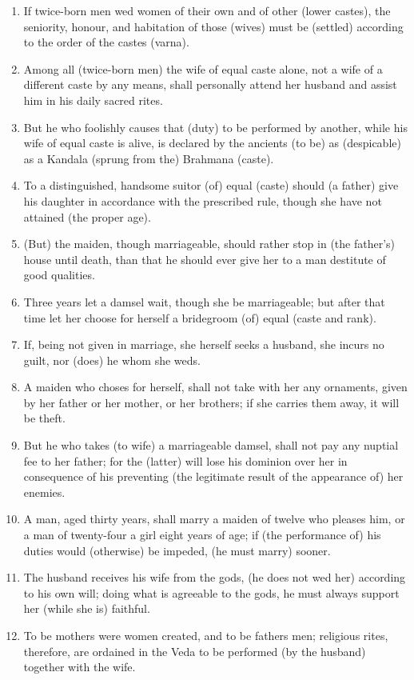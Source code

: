 \begin{enumerate}
\item If twice-born men wed women of their own and of other (lower castes), the seniority, honour, and habitation of those (wives) must be (settled) according to the order of the castes (varna).
\item Among all (twice-born men) the wife of equal caste alone, not a wife of a different caste by any means, shall personally attend her husband and assist him in his daily sacred rites.
\item But he who foolishly causes that (duty) to be performed by another, while his wife of equal caste is alive, is declared by the ancients (to be) as (despicable) as a Kandala (sprung from the) Brahmana (caste).
\item To a distinguished, handsome suitor (of) equal (caste) should (a father) give his daughter in accordance with the prescribed rule, though she have not attained (the proper age).
\item (But) the maiden, though marriageable, should rather stop in (the father's) house until death, than that he should ever give her to a man destitute of good qualities.
\item Three years let a damsel wait, though she be marriageable; but after that time let her choose for herself a bridegroom (of) equal (caste and rank).
\item If, being not given in marriage, she herself seeks a husband, she incurs no guilt, nor (does) he whom she weds.
\item A maiden who choses for herself, shall not take with her any ornaments, given by her father or her mother, or her brothers; if she carries them away, it will be theft.
\item But he who takes (to wife) a marriageable damsel, shall not pay any nuptial fee to her father; for the (latter) will lose his dominion over her in consequence of his preventing (the legitimate result of the appearance of) her enemies.
\item A man, aged thirty years, shall marry a maiden of twelve who pleases him, or a man of twenty-four a girl eight years of age; if (the performance of) his duties would (otherwise) be impeded, (he must marry) sooner.
\item The husband receives his wife from the gods, (he does not wed her) according to his own will; doing what is agreeable to the gods, he must always support her (while she is) faithful.
\item To be mothers were women created, and to be fathers men; religious rites, therefore, are ordained in the Veda to be performed (by the husband) together with the wife.

\end{enumerate}
